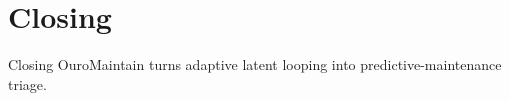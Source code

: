 \section{Closing}

\begin{frame}{Closing}
  \centering
  \Large OuroMaintain turns adaptive latent looping into predictive-maintenance triage.
\end{frame}
